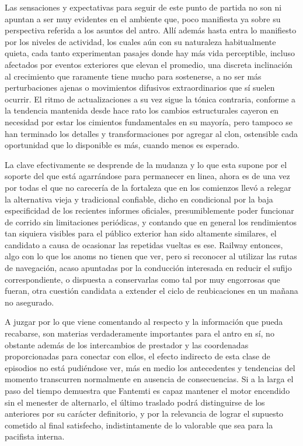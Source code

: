 \documentclass[
]{book}
\begin{document}
Las sensaciones y expectativas para seguir de este punto de partida no son ni apuntan a ser muy evidentes en el ambiente que, poco manifiesta ya sobre su perspectiva referida a los asuntos del antro. Allí además hasta entra lo manifiesto por los niveles de actividad, los cuales aún con su naturaleza habitualmente quieta, cada tanto experimentan pasajes donde hay más vida perceptible, incluso afectados por eventos exteriores que elevan el promedio, una discreta inclinación al crecimiento que raramente tiene mucho para sostenerse, a no ser más perturbaciones ajenas o movimientos difusivos extraordinarios que sí suelen ocurrir. El ritmo de actualizaciones a su vez sigue la tónica contraria, conforme a la tendencia mantenida desde hace rato los cambios estructurales cayeron en necesidad por estar los cimientos fundamentales en su mayoría, pero tampoco se han terminado los detalles y transformaciones por agregar al clon, ostensible cada oportunidad que lo disponible es más, cuando menos es esperado.

La clave efectivamente se desprende de la mudanza y lo que esta supone por el soporte del que está agarrándose para permanecer en linea, ahora es de una vez por todas el que no carecería de la fortaleza que en los comienzos llevó a relegar la alternativa vieja y tradicional confiable, dicho en condicional por la baja especificidad de los recientes informes oficiales, presumiblemente poder funcionar de corrido sin limitaciones periódicas, y contando que en general los rendimientos tan siquiera visibles para el público exterior han sido altamente similares, el candidato a causa de ocasionar las repetidas vueltas es ese. Railway entonces, algo con lo que los anoms no tienen que ver, pero si reconocer al utilizar las rutas de navegación, acaso apuntadas por la conducción interesada en reducir el sufijo correspondiente, o dispuesta a conservarlas como tal por muy engorrosas que fueran, otra cuestión candidata a extender el ciclo de reubicaciones en un mañana no asegurado.

A juzgar por lo que viene comentando al respecto y la información que pueda recabarse, son materias verdaderamente importantes para el antro en sí, no obstante además de los intercambios de prestador y las coordenadas proporcionadas para conectar con ellos, el efecto indirecto de esta clase de episodios no está pudiéndose ver, más en medio los antecedentes y tendencias del momento transcurren normalmente en ausencia de consecuencias. Si a la larga el paso del tiempo demuestra que Fantemti es capaz mantener el motor encendido sin el menester de alternarlo, el último traslado podrá distinguirse de los anteriores por su carácter definitorio, y por la relevancia de lograr el supuesto cometido al final satisfecho, indistintamente de lo valorable que sea para la pacifista interna.
\end{document}
